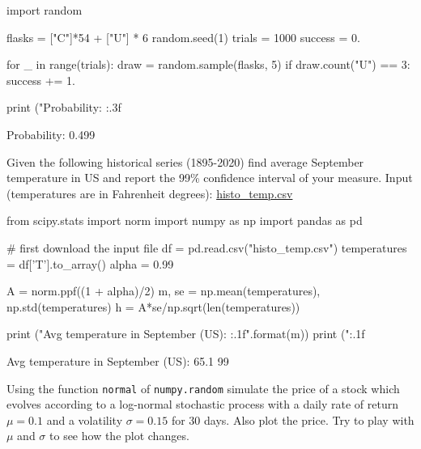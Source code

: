 \cprotEnv\begin{solution}
\begin{ipython}
import random

flasks = ["C"]*54 + ["U"] * 6
random.seed(1)
trials = 1000
success = 0.

for _ in range(trials):
    draw = random.sample(flasks, 5)
    if draw.count("U") == 3:
        success += 1.

print ("Probability: {:.3f}%
\end{ipython}
\begin{ioutput}
Probability: 0.499%
\end{ioutput}
\end{solution}

\begin{question}
Given the following historical series (1895-2020) find average September temperature in US and report the 99\% confidence interval of your measure.
\noindent
Input (temperatures are in Fahrenheit degrees): \href{https://raw.githubusercontent.com/matteosan1/finance_course/develop/libro/input_files/histo_temp.csv}{histo\_temp.csv}
\end{question}

\cprotEnv\begin{solution}
\begin{ipython}
from scipy.stats import norm
import numpy as np
import pandas as pd

# first download the input file
df = pd.read.csv("histo_temp.csv")
temperatures = df['T'].to_array()
alpha = 0.99

A = norm.ppf((1 + alpha)/2)
m, se = np.mean(temperatures), np.std(temperatures)
h = A*se/np.sqrt(len(temperatures))

print ("Avg temperature in September (US): {:.1f}".format(m))
print ("{:.1f}%
\end{ipython}
\begin{ioutput}
Avg temperature in September (US): 65.1
99%
\end{ioutput}
\end{solution}

\begin{question}
Using the function \texttt{normal} of \texttt{numpy.random} simulate the price of a stock which evolves according to a log-normal stochastic process with a daily rate of return \(\mu=0.1\) and a volatility \(\sigma=0.15\) for 30 days.
Also plot the price. Try to play with \(\mu\) and \(\sigma\) to see how the plot changes.
\end{question}


